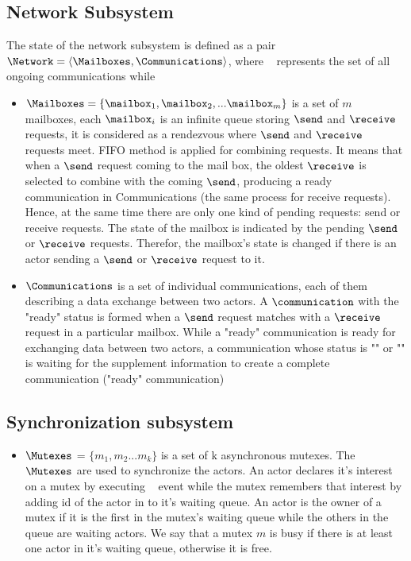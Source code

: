 \documentclass[a4paper,11pt]{article}
\begin{document}
\subsection{Network Subsystem}
The state of the network subsystem is defined as a pair $\Network = \langle \Mailboxes, \Communications \rangle$, where \Communications~ represents the set of all ongoing communications while 
\begin{itemize}[noitemsep]
\setlength{\itemsep}{3pt}
\item $\Mailboxes = \{ \mailbox_1, \mailbox_2, ... \mailbox_m \}$ is a set of $m$ mailboxes, each $\mailbox_i$ is an infinite queue storing $\send$ and $\receive$ requests, it is considered as a rendezvous
where $\send$ and $\receive$ requests meet. FIFO method is applied for combining requests. It means that when a $\send$ request coming to the mail box, the oldest $\receive$ is selected to combine with the coming $\send$, producing a ready communication in Communications (the same process for receive requests). Hence, at the same time there are only one kind of pending requests: send or receive requests. The state of the mailbox is indicated by the pending $\send$ or $\receive$ requests. Therefor, the mailbox's state is changed if there is an actor sending a $\send$ or $\receive$ request to it. 
\item $\Communications$ is a set of individual communications, each of them describing a data exchange  between two actors.  A $\communication$ with the "ready" status is formed when a $\send$ request matches with a $\receive$ request in a particular mailbox. While a "ready" communication is ready for exchanging data between two actors, a communication whose status is "\send" or "\receive" is waiting for the supplement information to create a complete communication ("ready" communication)
\end{itemize}

\subsection{Synchronization subsystem}
\begin{itemize}[noitemsep]
\setlength{\itemsep}{3pt}
 \item 
  $\Mutexes$ = $\{m_1, m_2 ... m_k \}$ is a set of k asynchronous mutexes. The $\Mutexes$ are used to synchronize the actors. An actor declares it's interest on a mutex by executing \mutexlock~ event while the mutex remembers that interest by adding id of the actor in to it's waiting queue. An actor is the owner of a mutex if it is the first in the mutex's waiting queue while the others in the queue are waiting actors. We say that a mutex $m$ is busy if there is at least one actor in it's waiting queue, otherwise it is free.
 \end{itemize}
 
\end{document}
